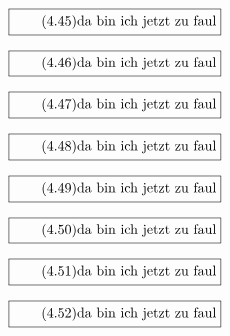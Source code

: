 \documentclass[11pt]{article}
\newcommand{\1}{ {\mathds{1}} }
\begin{document}
    \begin{equation}
      \boxed{
        \tag{4.45}
        \begin{split}
          \text{da bin ich jetzt zu faul}
        \end{split}
      }
    \end{equation}
    
    \begin{equation}
      \boxed{
        \tag{4.46}
        \begin{split}
          \text{da bin ich jetzt zu faul}
        \end{split}
      }
    \end{equation}

    \begin{equation}
      \boxed{
        \tag{4.47}
        \begin{split}
          \text{da bin ich jetzt zu faul}
        \end{split}
      }
    \end{equation}

    \begin{equation}
      \boxed{
        \tag{4.48}
        \begin{split}
          \text{da bin ich jetzt zu faul}
        \end{split}
      }
    \end{equation}
    
    \begin{equation}
      \boxed{
        \tag{4.49}
        \begin{split}
          \text{da bin ich jetzt zu faul}
        \end{split}
      }
    \end{equation}
    
    \begin{equation}
      \boxed{
        \tag{4.50}
        \begin{split}
          \text{da bin ich jetzt zu faul}
        \end{split}
      }
    \end{equation}
    
    \begin{equation}
      \boxed{
        \tag{4.51}
        \begin{split}
          \text{da bin ich jetzt zu faul}
        \end{split}
      }
    \end{equation}
    
    \begin{equation}
      \boxed{
        \tag{4.52}
        \begin{split}
          \text{da bin ich jetzt zu faul}
        \end{split}
      }
    \end{equation}
\end{document}

